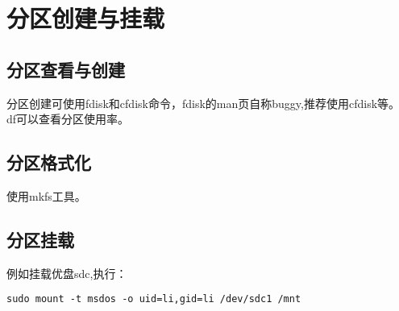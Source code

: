 \section{分区创建与挂载}

\subsection{分区查看与创建}
分区创建可使用fdisk和cfdisk命令，fdisk的man页自称buggy,推荐使用cfdisk等。
df可以查看分区使用率。

\subsection{分区格式化}
使用mkfs工具。

\subsection{分区挂载}
例如挂载优盘sdc,执行：
\begin{verbatim}
sudo mount -t msdos -o uid=li,gid=li /dev/sdc1 /mnt
\end{verbatim}


